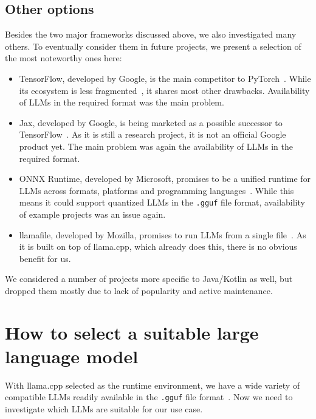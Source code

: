 \subsection{Other options}
\label{sec:otherOptions}
Besides the two major frameworks discussed above, we also investigated many others. To eventually consider them in future projects, we present a selection of the most noteworthy ones here:
\begin{itemize}
	\item TensorFlow, developed by Google, is the main competitor to PyTorch~\cite{abadiTensorFlowLargescaleMachine2015}. While its ecosystem is less fragmented~\cite{googleaiedgeteamTensorFlowLiteNow2024}, it shares most other drawbacks. Availability of \glspl{LLM} in the required format was the main problem.
	\item Jax, developed by Google, is being marketed as a possible successor to TensorFlow~\cite{jaxJaxmlJax2025}. As it is still a research project, it is not an official Google product yet. The main problem was again the availability of \glspl{LLM} in the required format.
	\item ONNX Runtime, developed by Microsoft, promises to be a unified runtime for \glspl{LLM} across formats, platforms and programming languages~\cite{onnxruntimedevelopersONNXRuntime2018,onnxruntimeONNXRuntimeHome}. While this means it could support quantized \glspl{LLM} in the \lstinline|.gguf| file format, availability of example projects was an issue again.
	\item llamafile, developed by Mozilla, promises to run \glspl{LLM} from a single file~\cite{mozillaMozillaOchoLlamafile2025,hoodIntroducingLlamafileMozilla2023}. As it is built on top of llama.cpp, which already does this, there is no obvious benefit for us.
\end{itemize}

We considered a number of projects more specific to Java/Kotlin as well, but dropped them mostly due to lack of popularity and active maintenance.

\section{How to select a suitable large language model}
\label{sec:howToSelectASuitableLLM}
With llama.cpp selected as the runtime environment, we have a wide variety of compatible \glspl{LLM} readily available in the \lstinline|.gguf| file format~\cite{huggingfaceModelsHuggingFace2025}. Now we need to investigate which \glspl{LLM} are suitable for our use case.

